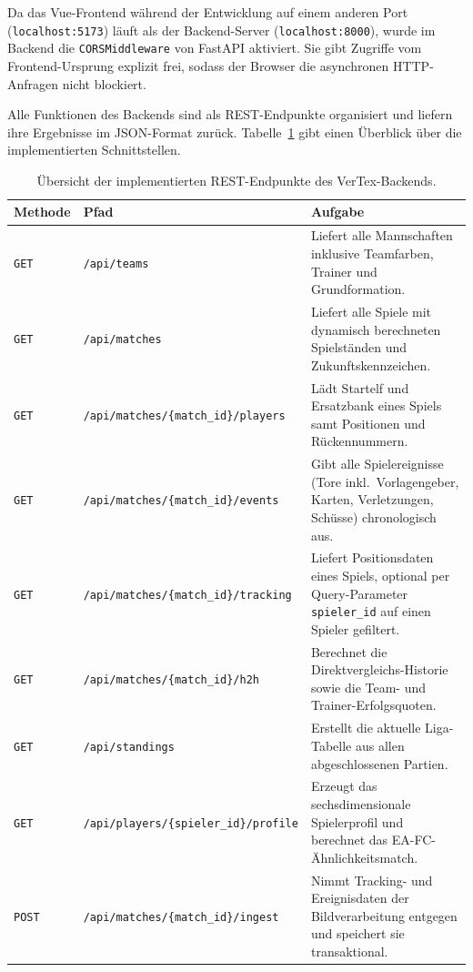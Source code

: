 Da das Vue-Frontend während der Entwicklung auf einem anderen Port
(\texttt{localhost:5173}) läuft als der Backend-Server (\texttt{localhost:8000}),
wurde im Backend die \texttt{CORSMiddleware} von FastAPI aktiviert. Sie gibt
Zugriffe vom Frontend-Ursprung explizit frei, sodass der Browser die
asynchronen HTTP-Anfragen nicht blockiert.

Alle Funktionen des Backends sind als REST-Endpunkte organisiert und liefern
ihre Ergebnisse im JSON-Format zurück. Tabelle~\ref{tab:api-endpunkte} gibt
einen Überblick über die implementierten Schnittstellen.

\begin{table}[htbp]
    \centering
    \footnotesize
    \caption{Übersicht der implementierten REST-Endpunkte des VerTex-Backends.}
    \label{tab:api-endpunkte}
    \begin{tabular}{l p{5.8cm} p{6.2cm}}
        \hline
        \textbf{Methode} & \textbf{Pfad} & \textbf{Aufgabe} \\
        \hline
        \texttt{GET} & \texttt{/api/teams} &
        Liefert alle Mannschaften inklusive Teamfarben, Trainer und Grundformation. \\
        \texttt{GET} & \texttt{/api/matches} &
        Liefert alle Spiele mit dynamisch berechneten Spielständen und Zukunftskennzeichen. \\
        \texttt{GET} & \texttt{/api/matches/\{match\_id\}/players} &
        Lädt Startelf und Ersatzbank eines Spiels samt Positionen und Rückennummern. \\
        \texttt{GET} & \texttt{/api/matches/\{match\_id\}/events} &
        Gibt alle Spielereignisse (Tore inkl.\ Vorlagengeber, Karten, Verletzungen, Schüsse) chronologisch aus. \\
        \texttt{GET} & \texttt{/api/matches/\{match\_id\}/tracking} &
        Liefert Positionsdaten eines Spiels, optional per Query-Parameter \texttt{spieler\_id} auf einen Spieler gefiltert. \\
        \texttt{GET} & \texttt{/api/matches/\{match\_id\}/h2h} &
        Berechnet die Direktvergleichs-Historie sowie die Team- und Trainer-Erfolgsquoten. \\
        \texttt{GET} & \texttt{/api/standings} &
        Erstellt die aktuelle Liga-Tabelle aus allen abgeschlossenen Partien. \\
        \texttt{GET} & \texttt{/api/players/\{spieler\_id\}/profile} &
        Erzeugt das sechsdimensionale Spielerprofil und berechnet das EA-FC-Ähnlichkeitsmatch. \\
        \texttt{POST} & \texttt{/api/matches/\{match\_id\}/ingest} &
        Nimmt Tracking- und Ereignisdaten der Bildverarbeitung entgegen und speichert sie transaktional. \\
        \hline
    \end{tabular}
\end{table}

